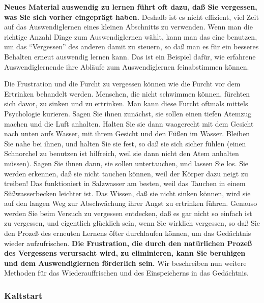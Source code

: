 \textbf{Neues Material auswendig zu lernen führt oft dazu, daß Sie vergessen, was Sie sich vorher eingeprägt haben.}
Deshalb ist es nicht effizient, viel Zeit auf das Auswendiglernen eines kleinen Abschnitts zu verwenden.
Wenn man die richtige Anzahl Dinge zum Auswendiglernen wählt, kann man das eine benutzen, um das \enquote{Vergessen} des anderen damit zu steuern, so daß man es für ein besseres Behalten erneut auswendig lernen kann.
Das ist ein Beispiel dafür, wie erfahrene Auswendiglernende ihre Abläufe zum Auswendiglernen feinabstimmen können.

Die Frustration und die Furcht zu vergessen können wie die Furcht vor dem Ertrinken behandelt werden.
Menschen, die nicht schwimmen können, fürchten sich davor, zu sinken und zu ertrinken.
Man kann diese Furcht oftmals mittels Psychologie kurieren.
Sagen Sie ihnen zunächst, sie sollen einen tiefen Atemzug machen und die Luft anhalten.
Halten Sie sie dann waagerecht mit dem Gesicht nach unten aufs Wasser, mit ihrem Gesicht und den Füßen im Wasser.
Bleiben Sie nahe bei ihnen, und halten Sie sie fest, so daß sie sich sicher fühlen (einen Schnorchel zu benutzen ist hilfreich, weil sie dann nicht den Atem anhalten müssen).
Sagen Sie ihnen dann, sie sollen untertauchen, und lassen Sie los. Sie werden erkennen, daß sie nicht tauchen können, weil der Körper dazu neigt zu treiben!
Das funktioniert in Salzwasser am besten, weil das Tauchen in einem Süßwasserbecken leichter ist.
Das Wissen, daß sie nicht sinken können, wird sie auf den langen Weg zur Abschwächung ihrer Angst zu ertrinken führen.
Genauso werden Sie beim Versuch zu vergessen entdecken, daß es gar nicht so einfach ist zu vergessen, und eigentlich glücklich sein, wenn Sie wirklich vergessen, so daß Sie den Prozeß des erneuten Lernens öfter durchlaufen können, um das Gedächtnis wieder aufzufrischen.
\textbf{Die Frustration, die durch den natürlichen Prozeß des Vergessens verursacht wird, zu eliminieren, kann Sie beruhigen und dem Auswendiglernen förderlich sein.}
Wir beschreiben nun weitere Methoden für das Wiederauffrischen und des Einspeicherns in das Gedächtnis.
 

\subsubsection{Kaltstart}
\label{c1iii6g}

